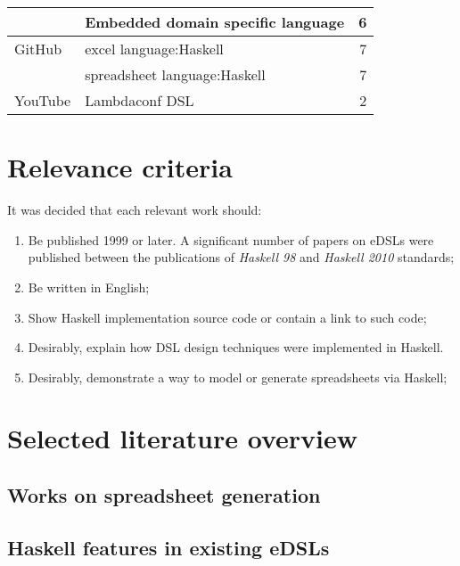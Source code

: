 \begin{longtable}{|l|l|r|}
                                   & Embedded domain specific language         &
    6                                                                                                     \\
    \hline
    GitHub
                                   & excel language:Haskell                    & 7                        \\
                                   & spreadsheet language:Haskell              & 7                        \\
    \hline
    YouTube
                                   & Lambdaconf DSL                            & 2                        \\
    \hline
\end{longtable}

\section{Relevance criteria} \label {sec:relevance}

It was decided that each relevant work should:

\begin{enumerate}[noitemsep, label=\arabic*) ]
    \item Be published 1999 or later. A significant number of papers on eDSLs were published between the publications of \textit{Haskell 98} and \textit{Haskell 2010} standards;
    \item Be written in English;
    \item Show Haskell implementation source code or contain a link to such code;
    \item Desirably, explain how DSL design techniques were implemented in Haskell.
    \item Desirably, demonstrate a way to model or generate spreadsheets via Haskell;
\end{enumerate}

\section{Selected literature overview} \label{sec:selectedLiterature}

\subsection{Works on spreadsheet generation}

\subsection{Haskell features in existing eDSLs}


